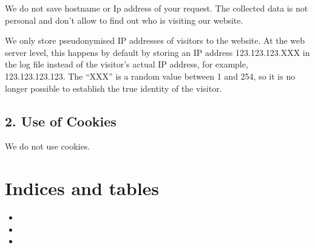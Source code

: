 \documentclass[letterpaper,10pt,english]{sphinxmanual}
\begin{document}
We do not save hostname or Ip address of your request.
The collected data is not personal and don’t allow to find out
who is visiting our website.

We only store pseudonymised IP addresses of visitors to the website.
At the web server level, this happens by default by storing an IP address
123.123.123.XXX in the log file instead of the visitor’s actual IP address,
for example, 123.123.123.123.
The “XXX” is a random value between 1 and 254, so it is no longer possible to
establish the true identity of the visitor.


\section{2. Use of Cookies}
\label{\detokenize{datenschutz:use-of-cookies}}
We do not use cookies.


\chapter{Indices and tables}
\label{\detokenize{contents:indices-and-tables}}\begin{itemize}
\item {} 

\item {} 

\item {} 

\end{itemize}


\renewcommand{\indexname}{Python Module Index}
\begin{sphinxtheindex}
\let\bigletter\sphinxstyleindexlettergroup
\bigletter{p}
\item\relax{}
\end{sphinxtheindex}

\renewcommand{\indexname}{Index}
\printindex
\end{document}
